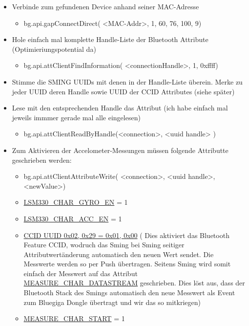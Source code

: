 \begin{itemize}
\begin{itemize}
	\item Verbinde zum gefundenen Device anhand seiner MAC-Adresse
		\begin{itemize}
			\itemsep 1pt \parskip 0pt \parsep 0pt
			\item bg.api.gapConnectDirect( <MAC-Addr>, 1, 60, 76, 100, 9)
		\end{itemize}



	\item Hole einfach mal komplette Handle-Liste der Bluetooth Attribute (Optimieriungspotential da)
			\begin{itemize}
				\itemsep 1pt \parskip 0pt \parsep 0pt
				\item bg.api.attClientFindInformation( <connectionHandle>, 1, 0xffff)
			\end{itemize}


	\item Stimme die SMING UUIDs mit denen in der Handle-Liste überein. Merke zu jeder UUID deren Handle sowie UUID der CCID Attributes (siehe später)


	\item Lese mit den entsprechenden Handle das Attribut (ich habe einfach mal jeweils immmer gerade mal alle eingelesen)
			\begin{itemize}
				\itemsep 1pt \parskip 0pt \parsep 0pt
				\item bg.api.attClientReadByHandle(<connection>, <uuid handle> )
			\end{itemize}


	\item Zum Aktivieren der Accelometer-Messungen müssen folgende Attributte geschrieben werden:
			\begin{itemize}
				\itemsep 1pt \parskip 0pt \parsep 0pt
				\item bg.api.attClientAttributeWrite( <connection>, <uuid handle>, <newValue>)
				\item \url{LSM330_CHAR_GYRO_EN} = 1 
				\item \url{LSM330_CHAR_ACC_EN} = 1 
				\item \url{CCID UUID 0x02, 0x29 = 0x01, 0x00} ( Dies aktiviert das Bluetooth Feature CCID, wodruch das Sming bei Sming seitiger Attributwertänderung automatisch den neuen Wert sendet. Die Messwerte werden so per Push übertragen. Seitens Sming wird somit einfach der Messwert auf das Attribut \url{MEASURE_CHAR_DATASTREAM} geschrieben. Dies löst aus, dass der Bluetooth Stack des Smings automatisch den neue Messwert als Event zum Bluegiga Dongle übertragt und wir das so mitkriegen)
				\item \url{MEASURE_CHAR_START} = 1
			\end{itemize}



\end{itemize}
\end{itemize}
